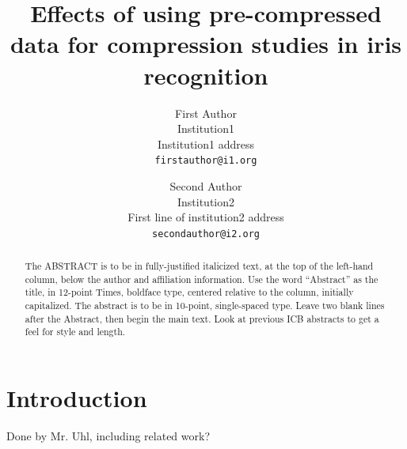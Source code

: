 \documentclass[10pt,twocolumn,letterpaper]{article}
\begin{document}
\title{Effects of using pre-compressed data for compression studies in iris recognition}

\author{First Author\\
Institution1\\
Institution1 address\\
{\tt\small firstauthor@i1.org}
\and
Second Author\\
Institution2\\
First line of institution2 address\\
{\tt\small secondauthor@i2.org}
}






\maketitle
\thispagestyle{empty}

\begin{abstract}
   The ABSTRACT is to be in fully-justified italicized text, at the top
   of the left-hand column, below the author and affiliation
   information. Use the word ``Abstract'' as the title, in 12-point
   Times, boldface type, centered relative to the column, initially
   capitalized. The abstract is to be in 10-point, single-spaced type.
   Leave two blank lines after the Abstract, then begin the main text.
   Look at previous ICB abstracts to get a feel for style and length. 
\end{abstract}

\section{Introduction}
Done by Mr. Uhl, including related work?
\end{document}
